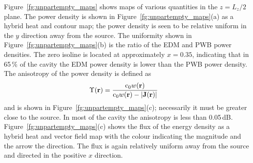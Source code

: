 \documentclass[a4paper]{article}
\numberwithin{equation}{section}
\newcounter{Figure}
\begin{document}
Figure~\ref{fg:unpartempty_maps} shows maps of various quantities in the $z=L_z/2$ plane. The power density is
shown in Figure~\ref{fg:unpartempty_maps}(a) as a hybrid heat and contour map; the power density is seen to
be relative uniform in the $y$ direction away from the source. The uniformity shown in Figure~\ref{fg:unpartempty_maps}(b)
is the ratio of the EDM and PWB power densities. The zero isoline is located at approximately $x=0.35$, indicating that in 65\,\% of 
the cavity the EDM power density is lower than the PWB power density. The anisotropy of the power density is defined as 
\begin{align}
\Upsilon(\boldsymbol{\mathrm{r}}) &= \frac{\mathrm{c}_0 w(\boldsymbol{\mathrm{r}})}{\mathrm{c}_0 w(\boldsymbol{\mathrm{r}}) - |\boldsymbol{\mathrm{J}}(\boldsymbol{\mathrm{r}})|} 
\end{align}
and is shown in Figure~\ref{fg:unpartempty_maps}(c); necessarily it must be greater close to the source. In most of the 
cavity the anisotropy is less than 0.05\,dB. Figure~\ref{fg:unpartempty_maps}(c) shows the flux of the energy density 
as a hybrid heat and vector
field map with the colour indicating the magnitude and the arrow the direction. The flux is again relatively uniform away from 
the source and directed in the positive $x$ direction. 
\end{document}
